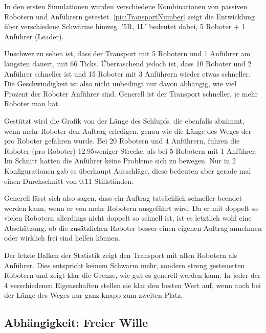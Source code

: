 In den ersten Simulationen wurden verschiedene Kombinationen von passiven Robotern und Anführern getestet. \autoref{pic:TransportNumber} zeigt die Entwicklung über verschiedene Schwärme hinweg. '5R, 1L' bedeutet dabei, 5 Roboter + 1 Anführer (Leader).

Unschwer zu sehen ist, dass der Transport mit 5 Robotern und 1 Anführer am längsten dauert, mit 66 Ticks. Überraschend jedoch ist, dass 10 Roboter und 2 Anführer schneller ist und 15 Roboter mit 3 Anführern wieder etwas schneller. Die Geschwindigkeit ist also nicht unbedingt nur davon abhängig, wie viel Prozent der Roboter Anführer sind. Generell ist der Transport schneller, je mehr Roboter man hat.

Gestützt wird die Grafik von der Länge des Schlupfs, die ebenfalls abnimmt, wenn mehr Roboter den Auftrag erledigen, genau wie die Länge des Weges der pro Roboter gefahren wurde. Bei 20 Robotern und 4 Anführern, fuhren die Roboter (pro Roboter) 12.95\per weniger Strecke, als bei 5 Robotern mit 1 Anführer.
Im Schnitt hatten die Anführer keine Probleme sich zu bewegen. Nur in 2 Konfigurationen gab es überhaupt Ausschläge, diese bedeuten aber gerade mal einen Durchschnitt von 0.11 Stillständen.

Generell lässt sich also sagen, dass ein Auftrag tatsächlich schneller beendet werden kann, wenn er von mehr Robotern ausgeführt wird. Da er mit doppelt so vielen Robotern allerdings nicht doppelt so schnell ist, ist es letztlich wohl eine Abschätzung, ob die zusätzlichen Roboter besser einen eigenen Auftrag annehmen oder wirklich frei sind helfen können.

Der letzte Balken der Statistik zeigt den Transport mit allen Robotern als Anführer. Dies entspricht keinem Schwarm mehr, sondern streng gesteuerten Robotern und zeigt klar die Grenze, wie gut es generell werden kann. In jeder der 4 verschiedenen Eigenschaften stellen sie klar den besten Wert auf, wenn auch bei der Länge des Weges nur ganz knapp zum zweiten Platz.

\subsection*{Abhängigkeit: Freier Wille}

